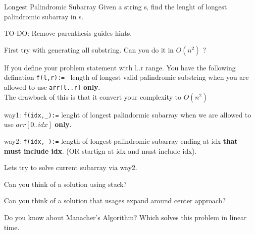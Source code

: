 \begin{problem}{Longest Palindromic Subarray}
    Given a string s, find the lenght of longest palindromic subarray in s.

    
\end{problem}

\begin{solution}

    \begin{guide}
        TO-DO: Remove parenthesis guides hints.
        
        \item First try with generating all substring. Can you do it in $O(n^2)$ ?

        \item
        If you define your problem statement with l..r range. You have the following defination \verb|f(l,r):= | length of longest valid palindromic substring when you are allowed to use \verb|arr[l..r]| \textbf{only}. \\
        The drawback of this is that it convert your complexity to $O(n^2)$

        \item
        
        way1: \verb|f(idx,_):=| lenght of longest palindormic subarray when we are allowed to use $arr[0..idx]$ \textbf{only}.

        way2: \verb|f(idx,_):=| length of longest palindromic subarray ending at idx \textbf{that must include idx}. (OR startign at idx and must include idx). 

       Lets try to solve current subarray via way2.

       \item Can you think of a solution using stack?
       
       \item Can you think of a solution that usages expand around center approach?
       
       \item Do you know about Manacher's Algorithm? Which solves this problem in linear time.
    


    \end{guide}
\end{solution}

